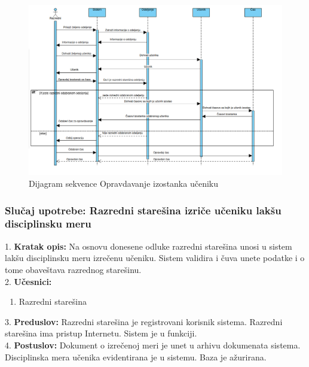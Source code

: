 \documentclass{article}
\begin{document}
\begin{figure} [!ht]
    \begin{center}
        \includegraphics[scale=0.34]{imgs/Dijagram_sekvence_razredni_pravda_cas.png}
    \end{center}
\caption{Dijagram sekvence Opravdavanje izostanka učeniku}
\end{figure}


\newpage
\subsubsection{Slučaj upotrebe: Razredni starešina izriče učeniku lakšu disciplinsku meru}
1. \textbf{Kratak opis:} Na osnovu donesene odluke razredni starešina unosi u sistem lakšu disciplinsku meru izrečenu učeniku. Sistem validira i čuva unete podatke i o tome obaveštava razrednog starešinu. \\

2. \textbf{Učesnici:}
\begin{enumerate} [label=(\alph*)]
\item Razredni starešina
\end{enumerate} 

3. \textbf{Preduslov:} Razredni starešina je registrovani korisnik sistema. Razredni starešina ima pristup Internetu. Sistem je u funkciji. \\

4. \textbf{Postuslov:} Dokument o izrečenoj meri je unet u arhivu dokumenata sistema. Disciplinska mera učenika evidentirana je u sistemu. Baza je ažurirana. \\
\end{document}
